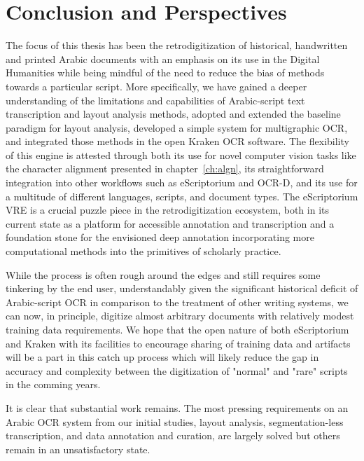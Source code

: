 \chapter{Conclusion and Perspectives}
\thispagestyle{empty}
\newpage


The focus of this thesis has been the retrodigitization of historical,
handwritten and printed Arabic documents with an emphasis on its use in the
Digital Humanities while being mindful of the need to reduce the bias of
methods towards a particular script. More specifically, we have gained a deeper
understanding of the limitations and capabilities of Arabic-script text
transcription and layout analysis methods, adopted and extended the baseline
paradigm for layout analysis, developed a simple system for multigraphic OCR,
and integrated those methods in the open Kraken OCR software. The flexibility
of this engine is attested through both its use for novel computer vision tasks
like the character alignment presented in chapter~\ref{ch:algn}, its
straightforward integration into other workflows such as eScriptorium and
OCR-D, and its use for a multitude of different languages, scripts, and
document types. The eScriptorium VRE is a crucial puzzle piece in the
retrodigitization ecosystem, both in its current state as a platform for
accessible annotation and transcription and a foundation stone for the
envisioned deep annotation incorporating more computational methods into the
primitives of scholarly practice.

While the process is often rough around the edges and still requires some
tinkering by the end user, understandably given the significant historical
deficit of Arabic-script OCR in comparison to the treatment of other writing
systems, we can now, in principle, digitize almost arbitrary documents with
relatively modest training data requirements. We hope that the open nature of
both eScriptorium and Kraken with its facilities to encourage sharing of
training data and artifacts will be a part in this catch up process which will
likely reduce the gap in accuracy and complexity between the digitization of
"normal" and "rare" scripts in the comming years.

It is clear that substantial work remains. The most pressing requirements on an
Arabic OCR system from our initial studies, layout analysis, segmentation-less
transcription, and data annotation and curation, are largely solved but others
remain in an unsatisfactory state.

